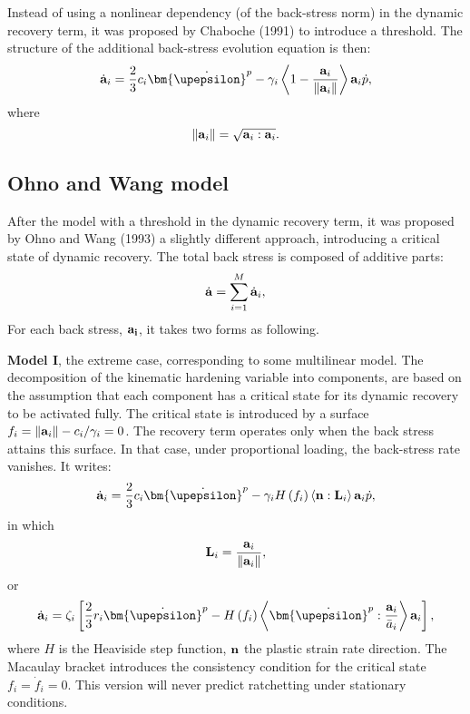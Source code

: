 Instead of using a nonlinear dependency (of the back-stress norm) in the dynamic recovery term, it was proposed by Chaboche (1991) \cite{Chaboche1991661} to introduce a threshold. The structure of the additional back-stress evolution equation is then:
\begin{equation}
{\dot{\bf a}}_i = \frac{2}{3}c_i{{\bm{\dot \upepsilon }}^p} - {\gamma _i} \left\langle {1 - \frac{{\bf{a}}_i}{{\left\| {\bf{a}}_i \right\|}}} \right\rangle {\bf{a}}_i\dot p,
\end{equation}
where
\begin{equation}
\left\| {\bf{a}}_i \right\| = \sqrt {{\bf{a}}_i:{\bf{a}}_i}.
\end{equation}
\subsection{Ohno and Wang model}
After the model with a threshold in the dynamic recovery term, it was proposed by Ohno and Wang (1993) \cite{ohno1993kinematic} a slightly different approach, introducing a critical state of dynamic recovery.
The total back stress is composed of additive parts:
\begin{equation}
{\dot{\bf a}} = \sum\limits_{i = 1}^M {{{{\dot{\bf a}}}_i}},
\end{equation}
For each back stress, $\bf{a}_i$, it takes two forms as following.

\textbf{Model I}, the extreme case, corresponding to some multilinear model.
The decomposition of the kinematic hardening variable into components, are based on the assumption that each component has a critical state for its dynamic recovery to be activated fully.
The critical state is introduced by a surface ${f_i} = \left\| {{{\bf{a}}_i}} \right\| - {c_i}/{\gamma _i} = 0$.
The recovery term operates only when the back stress attains this surface.
In that case, under proportional loading, the back-stress rate vanishes. It writes:
\begin{equation}
{{\dot{\bf a}}_i} = \frac{2}{3}{c_i}{{\bm{\dot \upepsilon }}^p} - {\gamma _i}H\left( {{f_i}} \right)\left\langle {{\bf{n}}:{{\bf{L}}_i}} \right\rangle {{\bf{a}}_i}\dot p,
\end{equation}
in which
\begin{equation}
{{\bf{L}}_i} = \frac{{{{\bf{a}}_i}}}{{\left\| {{{\bf{a}}_i}} \right\|}},
\end{equation}
or
\begin{equation}
{{\dot{\bf a}}_i} = {\zeta _i}\left[ {\frac{2}{3}{r_i}{{{\bm{\dot \upepsilon }}}^p} - H\left( {{f_i}} \right)\left\langle {{{{\bm{\dot \upepsilon }}}^p}:\frac{{{{\bf{a}}_i}}}{{{{\bar a}_i}}}} \right\rangle {{\bf{a}}_i}} \right],
\label{Eqn:Introduction2}
\end{equation}
where $H$ is the Heaviside step function, ${\bf{n}}$ the plastic strain rate direction.
The Macaulay bracket introduces the consistency condition for the critical state ${f_i} = {\dot f_i} = 0$.
This version will never predict ratchetting under stationary conditions.

